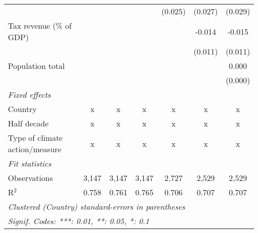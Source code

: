 \begin{tabular}{lcccccc}
                                                                 &         &              &              & (0.025)       & (0.027)       & (0.029)\\   
   Tax revenue (\% of GDP)                                       &         &              &              &               & -0.014        & -0.015\\   
                                                                 &         &              &              &               & (0.011)       & (0.011)\\   
   Population total                                              &         &              &              &               &               & 0.000\\   
                                                                 &         &              &              &               &               & (0.000)\\   
   \emph{Fixed effects}\\
   Country                                                       & x       & x            & x            & x             & x             & x\\  
   Half decade                                                   & x       & x            & x            & x             & x             & x\\  
   Type of climate action/measure                                & x       & x            & x            & x             & x             & x\\  
   \midrule \emph{Fit statistics}\\
   Observations                                                  & 3,147   & 3,147        & 3,147        & 2,727         & 2,529         & 2,529\\  
   R$^2$                                                         & 0.758   & 0.761        & 0.765        & 0.706         & 0.707         & 0.707\\  
   \midrule
   \multicolumn{7}{l}{\emph{Clustered (Country) standard-errors in parentheses}}\\
   \multicolumn{7}{l}{\emph{Signif. Codes: ***: 0.01, **: 0.05, *: 0.1}}\\
\end{tabular}
\par\endgroup


